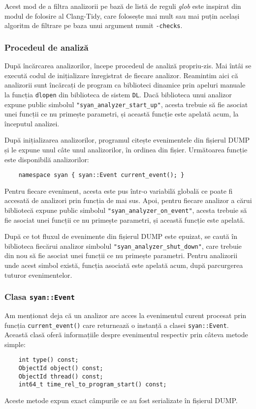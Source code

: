 Acest mod de a filtra analizorii pe bază de listă de reguli
\textit{glob} este inspirat din modul de folosire al
Clang-Tidy\cite{ClangTidy}, care folosește mai mult sau mai puțin
același algoritm de filtrare pe baza unui argument numit
\lstinline{-checks}.

\subsubsection{Procedeul de analiză}

După încărcarea analizorilor, începe procedeul de analiză propriu-zis.
Mai întâi se execută codul de inițializare înregistrat de fiecare
analizor. Reamintim aici că analizorii sunt încărcați de program ca
biblioteci dinamice prin apeluri manuale la funcția \lstinline{dlopen}
din biblioteca de sistem \lstinline{DL}\cite{DL}. Dacă biblioteca unui
analizor expune public simbolul \lstinline{"syan_analyzer_start_up"},
acesta trebuie să fie asociat unei funcții ce nu primește parametri, și
această funcție este apelată acum, la începutul analizei.

După inițializarea analizorilor, programul citește evenimentele din
fișierul DUMP și le expune unul câte unul analizorilor, în ordinea din
fișier. Următoarea funcție este disponibilă analizorilor:
\begin{lstlisting}
    namespace syan { syan::Event current_event(); }
\end{lstlisting}
Pentru fiecare eveniment, acesta este pus într-o variabilă globală ce
poate fi accesată de analizori prin funcția de mai sus. Apoi, pentru
fiecare analizor a cărui bibliotecă expune public simbolul
\lstinline{"syan_analyzer_on_event"}, acesta trebuie să fie asociat unei
funcții ce nu primește parametri, și această funcție este apelată.

După ce tot fluxul de evenimente din fișierul DUMP este epuizat, se
caută în biblioteca fiecărui analizor simbolul
\lstinline{"syan_analyzer_shut_down"}, care trebuie din nou să fie
asociat unei funcții ce nu primește parametri. Pentru analizorii unde
acest simbol există, funcția asociată este apelată acum, după
parcurgerea tuturor evenimentelor.

\subsubsection{Clasa \lstinline{syan::Event}}

Am menționat deja că un analizor are acces la evenimentul curent
procesat prin funcția \lstinline{current_event()} care returnează o
instanță a clasei \lstinline{syan::Event}. Această clasă oferă
informațiile despre evenimentul respectiv prin câteva metode simple:
\begin{lstlisting}
    int type() const;
    ObjectId object() const;
    ObjectId thread() const;
    int64_t time_rel_to_program_start() const;
\end{lstlisting}
Aceste metode expun exact câmpurile ce au fost serializate în fișierul
DUMP.

